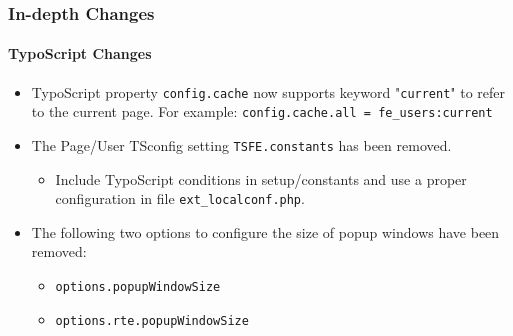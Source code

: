 \begin{frame}[fragile]
	\frametitle{In-depth Changes}
	\framesubtitle{TypoScript Changes}

	\begin{itemize}
		\item TypoScript property \texttt{config.cache} now supports keyword
			"\texttt{current}" to refer to the current page. For example:\newline
			\smaller\texttt{config.cache.all = fe\_users:current}\normalsize

		\item The Page/User TSconfig setting \texttt{TSFE.constants} has been removed.

			\begin{itemize}\smaller
				\item[\ding{228}] Include TypoScript conditions in setup/constants and use a proper configuration in file \texttt{ext\_localconf.php}.
			\end{itemize}

		\item The following two options to configure the size of popup windows have been removed:

			\begin{itemize}
				\item \texttt{options.popupWindowSize}
				\item \texttt{options.rte.popupWindowSize}
			\end{itemize}

	\end{itemize}

\end{frame}



